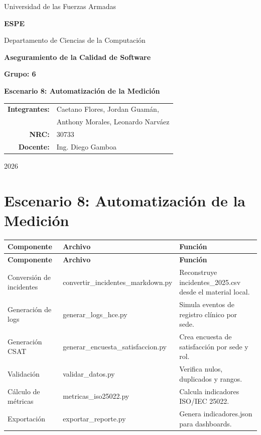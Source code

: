 \documentclass[11pt]{article}
\begin{document}
\begin{titlepage}
\centering
{\Large Universidad de las Fuerzas Armadas\par}
{\LARGE \textbf{ESPE}\par}
\vspace{0.35cm}
{\large Departamento de Ciencias de la Computación\par}
\vspace{1.5cm}
{\Large \textbf{Aseguramiento de la Calidad de Software}\par}
\vspace{0.5cm}
{\large \textbf{Grupo: 6}\par}
\vspace{1.2cm}
{\Large \textbf{Escenario 8: Automatización de la Medición}\par}
\vfill
\begin{tabular}{rl}
\textbf{Integrantes:} & Caetano Flores, Jordan Guamán,\\
& Anthony Morales, Leonardo Narváez\\
\textbf{NRC:} & 30733\\
\textbf{Docente:} & Ing. Diego Gamboa\\
\end{tabular}
\vfill
{\large 2026\par}
\end{titlepage}

\section*{Escenario 8: Automatización de la Medición}

\small
\begin{longtable}{p{} p{} p{}}
\toprule
\textbf{Componente} & \textbf{Archivo} & \textbf{Función} \\
\midrule
\endfirsthead
\toprule
\textbf{Componente} & \textbf{Archivo} & \textbf{Función} \\
\midrule
\endhead
Conversión de incidentes & convertir\_incidentes\_markdown.py & Reconstruye incidentes\_2025.csv desde el material local. \\
Generación de logs & generar\_logs\_hce.py & Simula eventos de registro clínico por sede. \\
Generación CSAT & generar\_encuesta\_satisfaccion.py & Crea encuesta de satisfacción por sede y rol. \\
Validación & validar\_datos.py & Verifica nulos, duplicados y rangos. \\
Cálculo de métricas & metricas\_iso25022.py & Calcula indicadores ISO/IEC 25022. \\
Exportación & exportar\_reporte.py & Genera indicadores.json para dashboards. \\
\bottomrule
\end{longtable}
\normalsize
\end{document}
